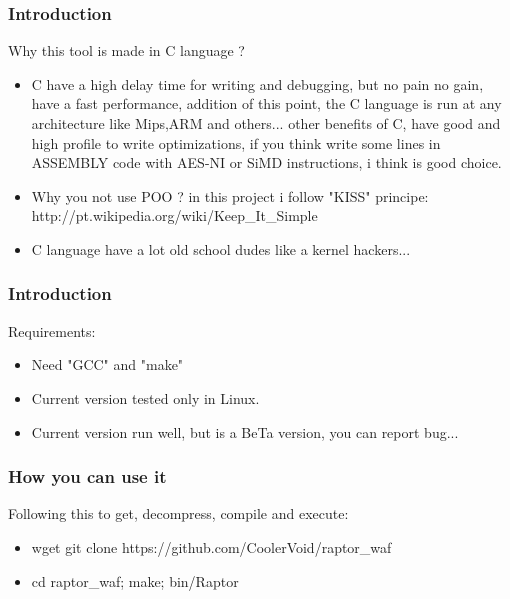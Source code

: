 \documentclass[serif,mathserif]{beamer}
\begin{document}
\begin{frame}
  \frametitle{Introduction}
  Why this tool is made in C language ?
  \begin{itemize}
  \item  C have a high delay time for writing and debugging, but no pain no gain, have a fast performance, addition of this point, the C language is run at any architecture like Mips,ARM and others... other benefits of C,  have good and high profile to write optimizations, if you think write some lines in ASSEMBLY code with AES-NI or SiMD instructions, i think is good choice. 
  \item  Why you not use POO ? in this project i follow "KISS" principe: http://pt.wikipedia.org/wiki/Keep\_It\_Simple
  \item  C language have a lot old school dudes like a kernel hackers... 
  \end{itemize}
\end{frame}



\begin{frame}
  \frametitle{Introduction}
  Requirements:
  \begin{itemize}
  \item  Need "GCC" and "make" 
  \item  Current version tested only in Linux.
  \item  Current version run well, but is a BeTa version, you can report bug...
  \end{itemize}
\end{frame}


\begin{frame}
  \frametitle{How you can use it}
  Following this to get, decompress, compile and execute:
  \begin{itemize}
  \item wget git clone https://github.com/CoolerVoid/raptor\_waf
  \item cd raptor\_waf; make; bin/Raptor
  \end{itemize}
\end{frame}
\end{document}
